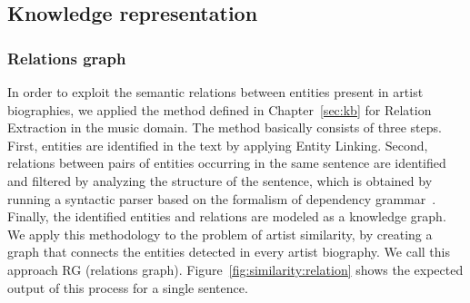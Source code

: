
\subsection{Knowledge representation}\label{sec:similarity:knowledge_representations}

\subsubsection{Relations graph}\label{sec:similarity:rel_graph} %

In order to exploit the semantic relations between entities present in artist biographies, we applied the method defined in Chapter~\ref{sec:kb} for Relation Extraction in the music domain. The method basically consists of three steps. First, entities are identified in the text by applying Entity Linking. Second, relations between pairs of entities occurring in the same sentence are identified and filtered by analyzing the structure of the sentence, which is obtained by running a syntactic parser based on the formalism of dependency grammar~\citep{Bohnet2010}. Finally, the identified entities and relations are modeled as a knowledge graph.
We apply this methodology to the problem of artist similarity, by creating a graph that connects the entities detected in every artist biography. We call this approach RG (relations graph). Figure~\ref{fig:similarity:relation} shows the expected output of this process for a single sentence.

